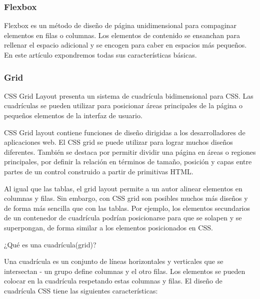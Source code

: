 \begin{enumerate}
\subsubsection{Flexbox}

Flexbox es un método de diseño de página unidimensional para compaginar elementos en filas o columnas. Los elementos de contenido se ensanchan para rellenar el espacio adicional y se encogen para caber en espacios más pequeños. En este artículo expondremos todas sus características básicas.

\subsubsection{Grid} \cite{mdn}

CSS Grid Layout presenta un sistema de cuadrícula bidimensional para CSS. Las cuadrículas se pueden utilizar para posicionar áreas principales de la página o pequeños elementos de la interfaz de usuario.

CSS Grid layout contiene funciones de diseño dirigidas a los desarrolladores de aplicaciones web. El CSS grid se puede utilizar para lograr muchos diseños diferentes. También se destaca por permitir dividir una página en áreas o regiones principales, por definir la relación en términos de tamaño, posición y capas entre partes de un control construido a partir de primitivas HTML.

Al igual que las tablas, el grid layout permite a un autor alinear elementos en columnas y filas. Sin embargo, con CSS grid son posibles muchos más diseños y de forma más sencilla que con las tablas. Por ejemplo, los elementos secundarios de un contenedor de cuadrícula podrían posicionarse para que se solapen y se superpongan, de forma similar a los elementos posicionados en CSS.

¿Qué es una cuadrícula(grid)?

Una cuadrícula es un conjunto de líneas horizontales y verticales que se intersectan - un grupo define columnas y el otro filas. Los elementos se pueden colocar en la cuadrícula respetando estas columnas y filas. El diseño de cuadrícula CSS tiene las siguientes características:


\end{enumerate}
